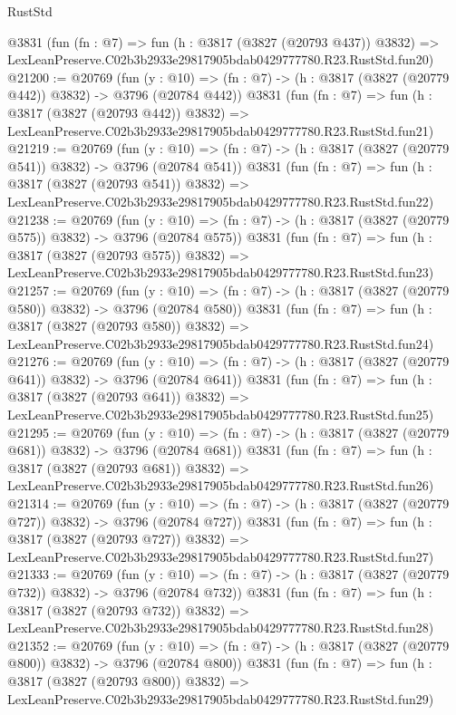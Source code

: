 \begin{lexlean}{RustStd}
\begin{coremodule}
    @3831
    (fun (fn : @7) =>
    fun (h : @3817 (@3827 (@20793 @437)) @3832) =>
    LexLeanPreserve.C02b3b2933e29817905bdab0429777780.R23.RustStd.fun20)
@21200 := @20769
    (fun (y : @10) => (fn : @7) -> (h : @3817 (@3827 (@20779 @442)) @3832) -> @3796 (@20784 @442))
    @3831
    (fun (fn : @7) =>
    fun (h : @3817 (@3827 (@20793 @442)) @3832) =>
    LexLeanPreserve.C02b3b2933e29817905bdab0429777780.R23.RustStd.fun21)
@21219 := @20769
    (fun (y : @10) => (fn : @7) -> (h : @3817 (@3827 (@20779 @541)) @3832) -> @3796 (@20784 @541))
    @3831
    (fun (fn : @7) =>
    fun (h : @3817 (@3827 (@20793 @541)) @3832) =>
    LexLeanPreserve.C02b3b2933e29817905bdab0429777780.R23.RustStd.fun22)
@21238 := @20769
    (fun (y : @10) => (fn : @7) -> (h : @3817 (@3827 (@20779 @575)) @3832) -> @3796 (@20784 @575))
    @3831
    (fun (fn : @7) =>
    fun (h : @3817 (@3827 (@20793 @575)) @3832) =>
    LexLeanPreserve.C02b3b2933e29817905bdab0429777780.R23.RustStd.fun23)
@21257 := @20769
    (fun (y : @10) => (fn : @7) -> (h : @3817 (@3827 (@20779 @580)) @3832) -> @3796 (@20784 @580))
    @3831
    (fun (fn : @7) =>
    fun (h : @3817 (@3827 (@20793 @580)) @3832) =>
    LexLeanPreserve.C02b3b2933e29817905bdab0429777780.R23.RustStd.fun24)
@21276 := @20769
    (fun (y : @10) => (fn : @7) -> (h : @3817 (@3827 (@20779 @641)) @3832) -> @3796 (@20784 @641))
    @3831
    (fun (fn : @7) =>
    fun (h : @3817 (@3827 (@20793 @641)) @3832) =>
    LexLeanPreserve.C02b3b2933e29817905bdab0429777780.R23.RustStd.fun25)
@21295 := @20769
    (fun (y : @10) => (fn : @7) -> (h : @3817 (@3827 (@20779 @681)) @3832) -> @3796 (@20784 @681))
    @3831
    (fun (fn : @7) =>
    fun (h : @3817 (@3827 (@20793 @681)) @3832) =>
    LexLeanPreserve.C02b3b2933e29817905bdab0429777780.R23.RustStd.fun26)
@21314 := @20769
    (fun (y : @10) => (fn : @7) -> (h : @3817 (@3827 (@20779 @727)) @3832) -> @3796 (@20784 @727))
    @3831
    (fun (fn : @7) =>
    fun (h : @3817 (@3827 (@20793 @727)) @3832) =>
    LexLeanPreserve.C02b3b2933e29817905bdab0429777780.R23.RustStd.fun27)
@21333 := @20769
    (fun (y : @10) => (fn : @7) -> (h : @3817 (@3827 (@20779 @732)) @3832) -> @3796 (@20784 @732))
    @3831
    (fun (fn : @7) =>
    fun (h : @3817 (@3827 (@20793 @732)) @3832) =>
    LexLeanPreserve.C02b3b2933e29817905bdab0429777780.R23.RustStd.fun28)
@21352 := @20769
    (fun (y : @10) => (fn : @7) -> (h : @3817 (@3827 (@20779 @800)) @3832) -> @3796 (@20784 @800))
    @3831
    (fun (fn : @7) =>
    fun (h : @3817 (@3827 (@20793 @800)) @3832) =>
    LexLeanPreserve.C02b3b2933e29817905bdab0429777780.R23.RustStd.fun29)

\end{coremodule}
\end{lexlean}
